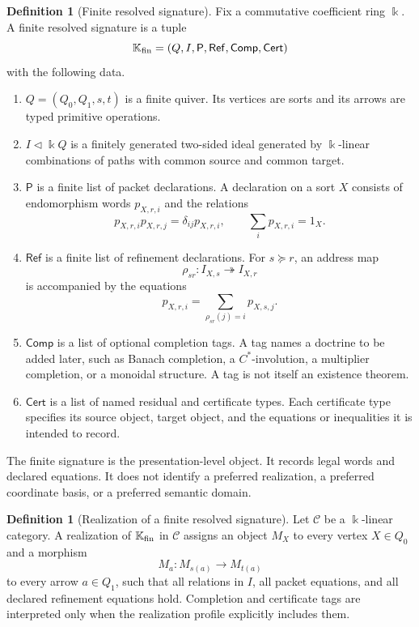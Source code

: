 \documentclass[11pt]{article}
\theoremstyle{definition}
\newtheorem{definition}[theorem]{Definition}
\theoremstyle{remark}
\newcommand{\kk}{\Bbbk}
\begin{document}
\begin{definition}[Finite resolved signature]
\label{def:finite-resolved-signature}
Fix a commutative coefficient ring \(\kk\).  A finite resolved signature is a tuple
\[
\mathbb K_{\rm fin}
=
(Q,I,\mathsf P,\mathsf{Ref},\mathsf{Comp},\mathsf{Cert})
\]
with the following data.
\begin{enumerate}[label=\textup{(\roman*)}]
\item \(Q=(Q_0,Q_1,s,t)\) is a finite quiver.  Its vertices are sorts and its arrows are typed primitive operations.
\item \(I\triangleleft \kk Q\) is a finitely generated two-sided ideal generated by \(\kk\)-linear combinations of paths with common source and common target.
\item \(\mathsf P\) is a finite list of packet declarations.  A declaration on a sort \(X\) consists of endomorphism words \(p_{X,r,i}\) and the relations
\[
p_{X,r,i}p_{X,r,j}=\delta_{ij}p_{X,r,i},
\qquad
\sum_i p_{X,r,i}=1_X.
\]
\item \(\mathsf{Ref}\) is a finite list of refinement declarations.  For \(s\succeq r\), an address map
\[
\rho_{sr}:I_{X,s}\twoheadrightarrow I_{X,r}
\]
is accompanied by the equations
\[
p_{X,r,i}
=
\sum_{\rho_{sr}(j)=i}p_{X,s,j}.
\]
\item \(\mathsf{Comp}\) is a list of optional completion tags.  A tag names a doctrine to be added later, such as Banach completion, a \(C^*\)-involution, a multiplier completion, or a monoidal structure.  A tag is not itself an existence theorem.
\item \(\mathsf{Cert}\) is a list of named residual and certificate types.  Each certificate type specifies its source object, target object, and the equations or inequalities it is intended to record.
\end{enumerate}
\end{definition}

The finite signature is the presentation-level object.  It records legal words and declared equations.  It does not identify a preferred realization, a preferred coordinate basis, or a preferred semantic domain.

\begin{definition}[Realization of a finite resolved signature]
\label{def:resolved-realization}
Let \(\mathcal C\) be a \(\kk\)-linear category.  A realization of \(\mathbb K_{\rm fin}\) in \(\mathcal C\) assigns an object \(M_X\) to every vertex \(X\in Q_0\) and a morphism
\[
M_a:M_{s(a)}\longrightarrow M_{t(a)}
\]
to every arrow \(a\in Q_1\), such that all relations in \(I\), all packet equations, and all declared refinement equations hold.  Completion and certificate tags are interpreted only when the realization profile explicitly includes them.
\end{definition}
\end{document}

